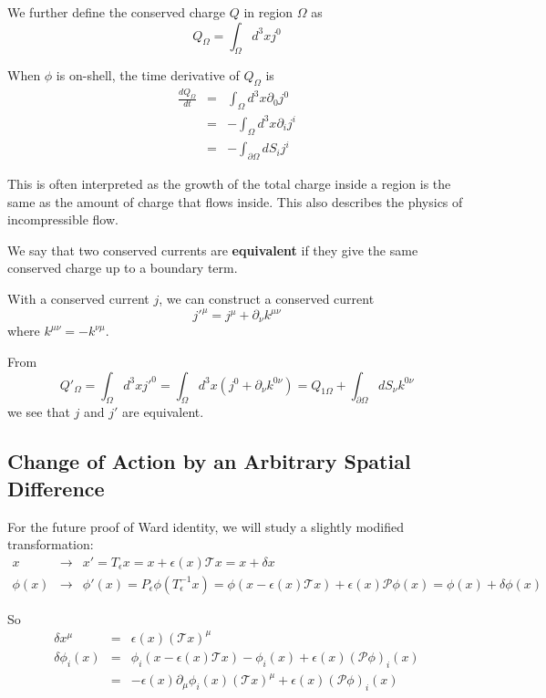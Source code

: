 \documentclass[12pt]{book}
\begin{document}
	We further define the conserved charge $Q$ in region $\Omega$ as 	
	\begin{equation}
		Q_\Omega=\int_\Omega d^3xj^0
	\end{equation}
	
	When $\phi$ is on-shell, the time derivative of $Q_\Omega$ is
	\begin{eqnarray}
		\frac{dQ_\Omega}{dt}&=&\int_\Omega d^3x\partial_0j^0 \\
		&=&-\int_\Omega d^3x\partial_ij^i \\
		&=&-\int_{\partial\Omega} dS_ij^i 
	\end{eqnarray}
	
	This is often interpreted as the growth of the total charge inside a region is the same as the amount of charge that flows inside. This also describes the physics of incompressible flow.
	
	We say that two conserved currents are \textbf{equivalent} if they give the same conserved charge up to a boundary term.
	
	With a conserved current $j$, we can construct a conserved current 
	\begin{equation}
	j'^\mu=j^\mu+\partial_\nu k^{\mu\nu}
	\end{equation}
	where $k^{\mu\nu}=-k^{\nu\mu}$.
	
	From
	\begin{equation}
	Q'_{\Omega}=\int_\Omega d^3x j'^0=\int_\Omega d^3x(j^0+\partial_\nu k^{0\nu})=Q_{1\Omega}+\int_{\partial\Omega} dS_\nu k^{0\nu}
	\end{equation}
	we see that $j$ and $j'$ are equivalent.
	
	\subsection{Change of Action by an Arbitrary Spatial Difference}
		
	For the future proof of Ward identity, we will study a slightly modified transformation:
	\begin{eqnarray}
		x&\longrightarrow&x'=T_\epsilon x=x+\epsilon(x)\mathcal Tx=x+\delta x\\
		\phi(x)&\longrightarrow&\phi'(x)=P_\epsilon\phi(T_\epsilon^{-1}x)=\phi(x-\epsilon(x)\mathcal Tx)+\epsilon(x)\mathcal P\phi(x)=\phi(x)+\delta\phi(x)
	\end{eqnarray}
	
	So
	\begin{eqnarray}
		\delta x^\mu&=&\epsilon(x)(\mathcal Tx)^\mu\\
		\delta\phi_i(x)&=&\phi_i(x-\epsilon(x)\mathcal Tx)-\phi_i(x)+\epsilon(x)(\mathcal P\phi)_i(x)\\
		&=&-\epsilon(x)\partial_\mu\phi_i(x)(\mathcal Tx)^\mu+\epsilon(x)(\mathcal P\phi)_i(x)
	\end{eqnarray}
	
\end{document}
